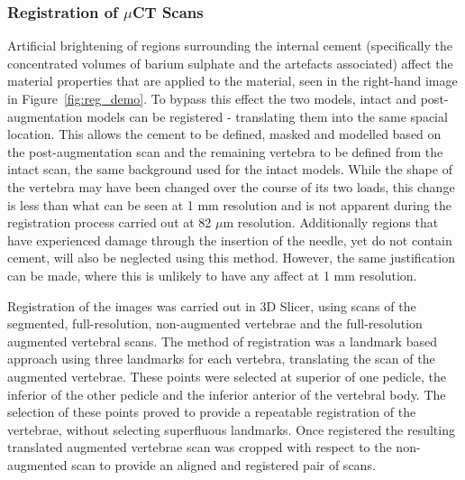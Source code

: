 \subsubsection{Registration of $\mu$CT Scans}

Artificial brightening of regions surrounding the internal cement (specifically the concentrated volumes of barium sulphate and the artefacts associated) affect the material properties that are applied to the material, seen in the right-hand image in Figure~\ref{fig:reg_demo}.
To bypass this effect the two models, intact and post-augmentation models can be registered - translating them into the same spacial location.
This allows the cement to be defined, masked and modelled based on the post-augmentation scan and the remaining vertebra to be defined from the intact scan, the same background used for the intact models.
While the shape of the vertebra may have been changed over the course of its two loads, this change is less than what can be seen at 1 mm resolution and is not apparent during the registration process carried out at 82 $\mu$m resolution.
Additionally regions that have experienced damage through the insertion of the needle, yet do not contain cement, will also be neglected using this method.
However, the same justification can be made, where this is unlikely to have any affect at 1 mm resolution.

Registration of the images was carried out in 3D Slicer, using scans of the segmented, full-resolution, non-augmented vertebrae and the full-resolution augmented vertebral scans.
The method of registration was a landmark based approach using three landmarks for each vertebra, translating the scan of the augmented vertebrae.
These points were selected at superior of one pedicle, the inferior of the other pedicle and the inferior anterior of the vertebral body.
The selection of these points proved to provide a repeatable registration of the vertebrae, without selecting superfluous landmarks.
Once registered the resulting translated augmented vertebrae scan was cropped with respect to the non-augmented scan to provide an aligned and registered pair of scans.

